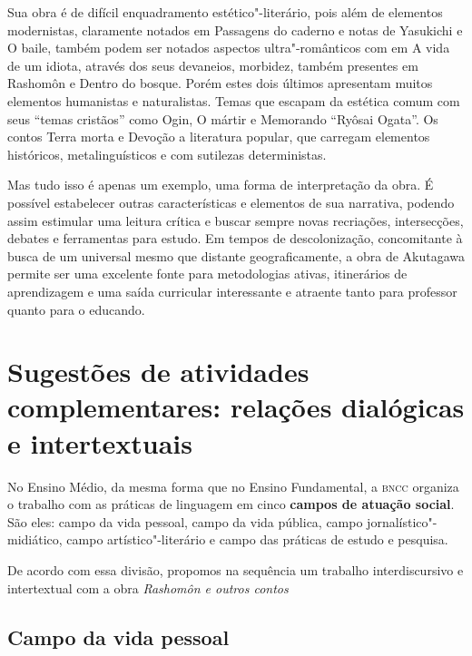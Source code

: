 \documentclass[12pt]{extarticle}
\begin{document}
Sua obra é de difícil enquadramento estético"-literário, pois além de
elementos modernistas, claramente notados em Passagens do caderno e
notas de Yasukichi e O baile, também podem ser notados aspectos
ultra"-românticos com em A vida de um idiota, através dos seus devaneios,
morbidez, também presentes em Rashomôn e Dentro do bosque. Porém estes
dois últimos apresentam muitos elementos humanistas e naturalistas.
Temas que escapam da estética comum com seus ``temas cristãos'' como
Ogin, O mártir e Memorando ``Ryôsai Ogata''. Os contos Terra morta e
Devoção a literatura popular, que carregam elementos históricos,
metalinguísticos e com sutilezas deterministas.

Mas tudo isso é apenas um exemplo, uma forma de interpretação da obra. É
possível estabelecer outras características e elementos de sua
narrativa, podendo assim estimular uma leitura crítica e buscar sempre
novas recriações, intersecções, debates e ferramentas para estudo. Em
tempos de descolonização, concomitante à busca de um universal mesmo que
distante geograficamente, a obra de Akutagawa permite ser uma excelente
fonte para metodologias ativas, itinerários de aprendizagem e uma saída
curricular interessante e atraente tanto para professor quanto para o
educando.

\section{Sugestões de atividades complementares: relações dialógicas e
intertextuais}


No Ensino Médio, da mesma forma que no Ensino Fundamental, a \textsc{bncc}
organiza o trabalho com as práticas de linguagem em cinco \textbf{campos
de atuação social}. São eles: campo da vida pessoal, campo da vida
pública, campo jornalístico"-midiático, campo artístico"-literário e campo
das práticas de estudo e pesquisa.

De acordo com essa divisão, propomos na sequência um trabalho
interdiscursivo e intertextual com a obra \emph{Rashomôn e outros
contos}

\subsection{Campo da vida pessoal}
\end{document}
